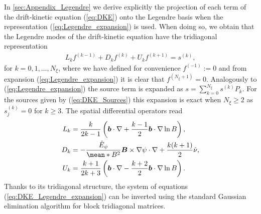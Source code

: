   
 In \ref{sec:Appendix_Legendre} we derive explicitly the projection of each term of the drift-kinetic equation (\ref{eq:DKE}) onto the Legendre basis when the representation (\ref{eq:Legendre_expansion}) is used. When doing so, we obtain that the Legendre modes of the drift-kinetic equation have the tridiagonal representation  
 \begin{align}
 	L_k f^{(k-1)} + D_k f^{(k)} + U_k f^{(k+1)} = s^{(k)},  
 	\label{eq:DKE_Legendre_expansion}
 \end{align}
 for $k=0,1,\ldots ,N_\xi$, where we have defined for convenience $f^{(-1)}:=0$ and from expansion (\ref{eq:Legendre_expansion}) it is clear that $f^{(N_\xi+1)}=0$. Analogously to (\ref{eq:Legendre_expansion}) the source term is expanded as $s=\sum_{k=0}^{N_\xi} s^{(k)} P_k$. For the sources given by (\ref{eq:DKE_Sources}) this expansion is exact when $N_\xi\ge2$ as $s_j^{(k)}=0$ for $k\ge 3$. The spatial differential operators read 
 \begin{align}
 	L_k & = 
 	\frac{k}{2k-1} 
 	\left(
 	\vb*{b} \cdot \nabla 
 	+
 	\frac{k-1}{2}
 	\vb*{b}\cdot\nabla \ln B
 	\right), \label{eq:DKE_Legendre_expansion_Lower}
 	\\ 
 	D_k & = - 
 	\frac{\hat{E}_\psi}{\mean*{B^2}}
 	\vb*{B}\times \nabla\psi  \cdot \nabla 
 	+  
 	\frac{k(k+1)}{2}
 	\hat{\nu} , \label{eq:DKE_Legendre_expansion_Diagonal}
 	\\
 	U_k & =  
 	\frac{k+1}{2k+3} 
 	\left(
 	\vb*{b} \cdot \nabla 
 	-
 	\frac{k+2}{2}
 	\vb*{b}\cdot\nabla \ln B
 	\right). \label{eq:DKE_Legendre_expansion_Upper}
 \end{align}
Thanks to its tridiagonal structure, the system of equations (\ref{eq:DKE_Legendre_expansion}) can be inverted using the standard Gaussian elimination algorithm for block tridiagonal matrices. 


